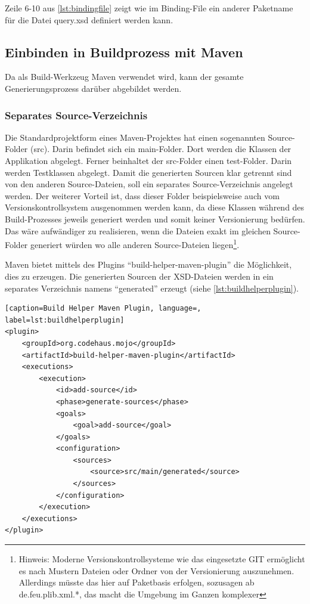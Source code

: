 Zeile 6-10 aus \autoref{lst:bindingfile} zeigt wie im Binding-File ein anderer Paketname für die Datei query.xsd definiert werden kann. 

\subsection{Einbinden in Buildprozess mit Maven}
Da als Build-Werkzeug \gls{Maven} verwendet wird, kann der gesamte Generierungsprozess darüber abgebildet werden. 

\subsubsection{Separates Source-Verzeichnis}
Die Standardprojektform eines Maven-Projektes hat einen sogenannten Source-Folder (src). Darin befindet sich ein main-Folder. Dort werden die Klassen der Applikation abgelegt. Ferner beinhaltet der src-Folder einen test-Folder. Darin werden Testklassen abgelegt. 
Damit die generierten Sourcen klar getrennt sind von den anderen Source-Dateien, soll ein separates Source-Verzeichnis angelegt werden. Der weiterer Vorteil ist, dass dieser Folder beispielsweise auch vom Versionskontrollsystem ausgenommen werden kann, da diese Klassen während des Build-Prozesses jeweils generiert werden und somit keiner Versionierung bedürfen. Das wäre aufwändiger zu realisieren, wenn die Dateien exakt im gleichen Source-Folder generiert würden wo alle anderen Source-Dateien liegen\footnote{Hinweis: Moderne Versionskontrollsysteme wie das eingesetzte GIT ermöglicht es nach Mustern Dateien oder Ordner von der Versionierung auszunehmen. Allerdings müsste das hier auf Paketbasis erfolgen, sozusagen ab de.feu.plib.xml.*, das macht die Umgebung im Ganzen komplexer}. 

Maven bietet mittels des Plugins \enquote{build-helper-maven-plugin} die Möglichkeit, dies zu erzeugen. 
Die generierten Sourcen der XSD-Dateien werden in ein separates Verzeichnis namens \enquote{generated} erzeugt (siehe \autoref{lst:buildhelperplugin}). 

\begin{lstlisting}[caption=Build Helper Maven Plugin, language=, label=lst:buildhelperplugin]
<plugin>
    <groupId>org.codehaus.mojo</groupId>
    <artifactId>build-helper-maven-plugin</artifactId>
    <executions>
        <execution>
            <id>add-source</id>
            <phase>generate-sources</phase>
            <goals>
                <goal>add-source</goal>
            </goals>
            <configuration>
                <sources>
                    <source>src/main/generated</source>
                </sources>
            </configuration>
        </execution>
    </executions>
</plugin>
\end{lstlisting}

